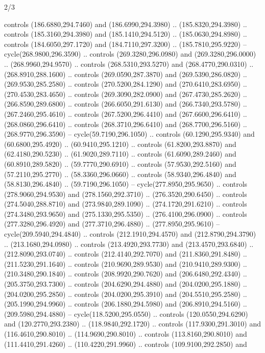 \begin{flagdescription}{2/3}
\begin{scope}[xshift=0.5\flaglength,yshift=0.5\flagwidth,scale=\stretchfactor]
\begin{scope}[scale=0.001645\flagwidth,yshift=65mm,xshift=-63mm]
\begin{scope}[y=0.80pt, x=0.80pt, yscale=-1,]
\begin{scope}[cm={{1.33333,0.0,0.0,1.33333,(0.0,1e-05)}}]
  controls (186.6880,294.7460) and (186.6990,294.3980) .. (185.8320,294.3980) ..
  controls (185.3160,294.3980) and (185.1410,294.5120) .. (185.0630,294.8980) ..
  controls (184.6050,297.1720) and (184.7110,297.3200) .. (185.7810,295.9220) --
  cycle(268.9800,296.3590) .. controls (269.3280,296.0980) and
  (269.3280,296.0000) .. (268.9960,294.9570) .. controls (268.5310,293.5270) and
  (268.4770,290.0310) .. (268.8910,288.1600) .. controls (269.0590,287.3870) and
  (269.5390,286.0820) .. (269.9530,285.2580) .. controls (270.5200,284.1290) and
  (270.6410,283.6950) .. (270.4530,283.4650) .. controls (269.3090,282.0900) and
  (267.4730,285.2620) .. (266.8590,289.6800) .. controls (266.6050,291.6130) and
  (266.7340,293.5780) .. (267.2460,295.4610) .. controls (267.5200,296.4410) and
  (267.6600,296.6410) .. (268.0860,296.6410) .. controls (268.3710,296.6410) and
  (268.7700,296.5160) .. (268.9770,296.3590) -- cycle(59.7190,296.1050) ..
  controls (60.1290,295.9340) and (60.6800,295.4920) .. (60.9410,295.1210) ..
  controls (61.8200,293.8870) and (62.4180,290.5230) .. (61.9020,289.7110) ..
  controls (61.6090,289.2460) and (60.8910,289.5820) .. (59.7770,290.6910) ..
  controls (57.9530,292.5160) and (57.2110,295.2770) .. (58.3360,296.0660) ..
  controls (58.9340,296.4840) and (58.8130,296.4840) .. (59.7190,296.1050) --
  cycle(277.8950,295.9650) .. controls (278.9060,294.9530) and
  (278.1560,292.3710) .. (276.3520,290.6450) .. controls (274.5040,288.8710) and
  (273.9840,289.1090) .. (274.1720,291.6210) .. controls (274.3480,293.9650) and
  (275.1330,295.5350) .. (276.4100,296.0900) .. controls (277.3280,296.4920) and
  (277.3710,296.4880) .. (277.8950,295.9610) -- cycle(209.5940,294.4840) ..
  controls (212.1910,294.4570) and (212.8790,294.3790) .. (213.1680,294.0980) ..
  controls (213.4920,293.7730) and (213.4570,293.6840) .. (212.8090,293.0740) ..
  controls (212.4140,292.7070) and (211.8360,291.8480) .. (211.5230,291.1640) ..
  controls (210.9690,289.9530) and (210.9410,289.9300) .. (210.3480,290.1840) ..
  controls (208.9920,290.7620) and (206.6480,292.4340) .. (205.3750,293.7300) ..
  controls (204.6290,294.4880) and (204.0200,295.1880) .. (204.0200,295.2850) ..
  controls (204.0200,295.3910) and (204.5510,295.2580) .. (205.1990,294.9960) ..
  controls (206.1880,294.5980) and (206.8910,294.5160) .. (209.5980,294.4880) --
  cycle(118.5200,295.0550) .. controls (120.0550,294.6290) and
  (120.2770,293.2380) .. (118.9840,292.1720) .. controls (117.9300,291.3010) and
  (116.4610,290.8010) .. (114.9690,290.8010) .. controls (113.8160,290.8010) and
  (111.4410,291.4260) .. (110.4220,291.9960) .. controls (109.9100,292.2850) and

\end{scope}
\end{scope}
\end{scope}
\end{scope}
\end{flagdescription}
